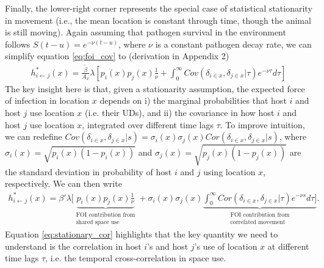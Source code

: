 \documentclass[letterpaper]{article}
\begin{document}
Finally, the lower-right corner represents the special case of statistical stationarity in movement (i.e., the mean location is constant through time, though the animal is still moving).
Again assuming that pathogen survival in the environment follows $S(t - u) = e^{-\nu (t - u)}$, where $\nu$ is a constant pathogen decay rate,  we can simplify equation \ref{eq:foi_cov} to (derivation in Appendix 2)
\begin{equation}
    \begin{aligned}
   h^*_{i \leftarrow j}(x) = \frac{\tilde{\beta}}{A_x} \lambda \left[p_i(x)p_j(x) \frac{1}{\nu} + \int_{0}^{\infty} Cov(\delta_{i \in x}, \delta_{j \in x} | \tau) e^{-\nu \tau} d\tau\right]
    \end{aligned}
    \label{eq:foi_stationary}
\end{equation}
The key insight here is that, given a stationarity assumption, the expected force of infection in location $x$ depends on i) the marginal probabilities that host $i$ and host $j$ use location $x$ (i.e. their UDs), 
and ii) the covariance in how host $i$ and host $j$ use location $x$, integrated over different time lags $\tau$. 
To improve intuition, we can redefine $Cov(\delta_{i \in x}, \delta_{j \in x} | s) = \sigma_i(x) \sigma_j(x) Cor(\delta_{i \in x}, \delta_{j \in x} | s)$, where $\sigma_i(x) = \sqrt{p_i(x)(1 - p_i(x))}$  and $\sigma_j(x) = \sqrt{p_j(x)(1 - p_j(x))}$ are the standard deviation in probability of host $i$ and $j$ using location $x$, respectively.  We can then write
\begin{equation}
    \begin{aligned}
    h^*_{i \leftarrow j}(x) = \beta' \lambda [ \underbrace{p_i(x)p_j(x) \frac{1}{\nu}}_{\substack{\text{FOI contribution from} \\ \text{shared space use}}} + \sigma_i(x) \sigma_j(x) \underbrace{\int_{0}^{\infty} Cor(\delta_{i \in x}, \delta_{j \in x} | \tau) e^{-\nu s} d\tau]}_{\substack{\text{FOI contribution from} \\ \text{correlated movement}}}.
    \end{aligned}
    \label{eq:stationary_cor}
\end{equation}
Equation \ref{eq:stationary_cor} highlights that the key quantity we need to understand is the correlation in host $i$'s and host $j$'s use of location $x$ at different time lags $\tau$, i.e. the temporal cross-correlation in space use.
\end{document}
